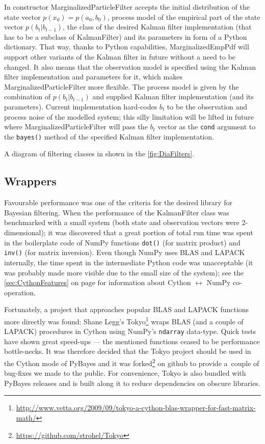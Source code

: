 In constructor MarginalizedParticleFilter accepts the initial distribution of the state vector
\(p(x_0) = p(a_0, b_0)\), process model of the empirical part of the state vector \(p(b_t|b_{t-1})\),
the class of the desired Kalman filter implementation (that has to be a subclass of KalmanFilter)
and its parameters in form of a Python dictionary. That way, thanks to Python capabilities,
MarginalizedEmpPdf will support other variants of the Kalman filter in future without a need to be
changed. It also means that the observation model is specified using the Kalman filter implementation
and parameters for it, which makes MarginalizedParticleFilter more flexible. The process model is
given by the combination of \(p(b_t|b_{t-1})\) and supplied Kalman filter implementation (and its
parameters). Current implementation hard-codes \(b_t\) to be the observation and process noise of
the modelled system; this silly limitation will be lifted in future where MarginalizedParticleFilter
will pass the \(b_t\) vector as the \verb|cond| argument to the \verb|bayes()| method of the
specified Kalman filter implementation.

A diagram of filtering classes in shown in the \autoref{fig:DiaFilters}.

\subsection{Wrappers} \label{sec:PyBayesWrappers}

Favourable performance was one of the criteria for the desired library for Bayesian filtering. When
the performance of the KalmanFilter class was benchmarked with a small system (both state and
observation vectors were 2-dimensional); it was discovered that a great portion of total run time
was spent in the boilerplate code of NumPy functions \verb|dot()| (for matrix product) and
\verb|inv()| (for matrix inversion). Even though NumPy uses BLAS and LAPACK internally, the time
spent in the intermediate Python code was unacceptable (it was probably made more visible due to
the small size of the system); see the \autoref{sec:CythonFeatures} on page
\pageref{sec:CythonFeatures} for information about Cython \(\leftrightarrow \) NumPy co-operation.

Fortunately, a project that approaches popular BLAS and LAPACK functions more directly was found:
Shane Legg's Tokyo\footnote{\url{http://www.vetta.org/2009/09/tokyo-a-cython-blas-wrapper-for-fast-matrix-math/}}
wraps BLAS (and a couple of LAPACK) procedures in Cython using NumPy's \verb|ndarray| data-type.
Quick tests have shown great speed-ups --- the mentioned functions ceased to be performance
bottle-necks. It was therefore decided that the Tokyo project should be used in the Cython mode of
PyBayes and it was forked\footnote{\url{https://github.com/strohel/Tokyo}} on github to provide
a~couple of bug-fixes we made to the public. For convenience, Tokyo is also bundled with PyBayes
releases and is built along it to reduce dependencies on obscure libraries.


